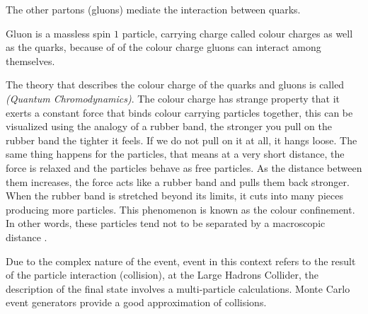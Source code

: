 The other partons (gluons)  mediate the interaction between quarks. 

Gluon is a massless spin $1$ particle, carrying charge called colour charges as well as the quarks, because of of the colour charge gluons can interact among themselves.

The theory that describes the colour charge of the quarks and gluons is called \emph{(Quantum Chromodynamics)}. The colour charge has strange property that it exerts a constant force that binds colour carrying particles together, this can be visualized using the analogy of a rubber band, the stronger you pull on the rubber band the tighter it feels.
If we do not pull on it at all, it hangs loose. The same thing happens for the particles,  that means at a very short distance, the force is relaxed and the particles behave as free particles. As the distance between them increases, the force acts like a rubber band and pulls them back stronger. When the rubber band is stretched beyond its limits, it cuts into many pieces producing more particles. This phenomenon is known as the colour confinement. In other words, these particles tend not to be separated by a macroscopic distance
 \citep{particle}.

 Due to the complex nature of the event, event in this context refers to the result of the particle interaction (collision), at the Large Hadrons Collider, the description of the final state involves a multi-particle calculations.
 Monte Carlo event generators provide a good approximation of collisions.\label{sec}

